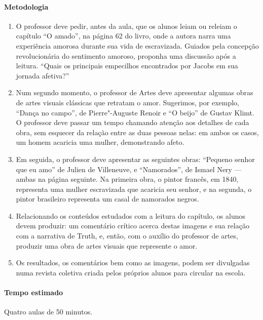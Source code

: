 \documentclass[11pt]{extarticle}
\begin{document}
 \paragraph{Metodologia}
   \begin{enumerate}
    \item
      O professor deve pedir, antes da aula, que os alunos leiam ou releiam 
      o capítulo ``O amado'', 
    na página 62 do livro, onde a autora narra uma experiência amorosa durante 
    sua vida de escravizada. Guiados pela concepção revolucionária do sentimento 
    amoroso, proponha uma discussão após a leitura. 
    ``Quais os principais empecilhos encontrados por Jacobs em sua jornada afetiva?''

    \item
    Num segundo momento, o professor de Artes deve apresentar algumas obras
    de artes visuais clássicas que retratam o amor. Sugerimos, por exemplo,
    ``Dança no campo'', de Pierre"-Auguste Renoir e ``O beijo'' de Gustav Klimt.
    O professor deve passar um tempo chamando atenção aos detalhes de cada 
    obra, sem esquecer da relação entre as duas pessoas nelas: em ambos
    os casos, um homem acaricia uma mulher, demonstrando afeto.

    \item
    Em seguida, o professor deve apresentar as seguintes obras: 
    ``Pequeno senhor que eu amo'' de Julien de Villeneuve, e ``Namorados'',
    de Ismael Nery --- ambas na página seguinte. Na primeira obra, o pintor francês, em 1840, representa 
    uma mulher escravizada que acaricia seu senhor, e na segunda, o pintor 
    brasileiro representa um casal de namorados negros. 

    \item
    Relacionando os conteúdos estudados com a leitura do capítulo, 
    os alunos devem produzir: um comentário crítico acerca destas imagens 
    e sua relação com a narrativa de Truth, e, então, com o auxílio do
    professor de artes, produzir uma obra de artes visuais que represente o amor. 

    \item
    Os resultados, os comentários bem como as imagens, podem ser divulgadas
    numa revista coletiva criada pelos próprios alunos para circular na escola. 
\end{enumerate}

 \paragraph{Tempo estimado} Quatro aulas de 50 minutos.
\end{document}
